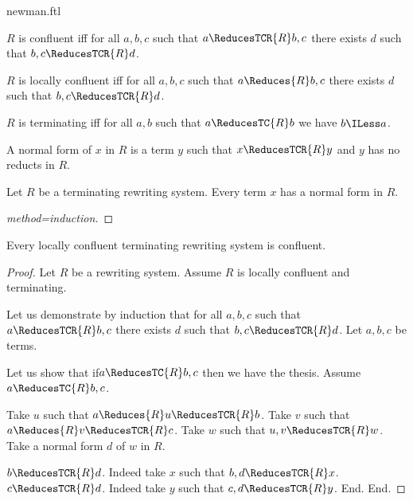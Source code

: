 \documentclass{stex}
\begin{document}
\begin{smodule}{newman.ftl}
\begin{forthel}
  \begin{definition}[title=Confluency]
    $R$ is confluent iff for all $a,b,c$ such that $a \ReducesTCR{R} b,c$ there exists $d$ such that $b,c \ReducesTCR{R} d$.
  \end{definition}

  \begin{definition}[title=Local Confluency]
    $R$ is locally confluent iff for all $a, b, c$ such that $a \Reduces{R} b, c$   there exists $d$ such that $b, c \ReducesTCR{R} d$.
  \end{definition}

  \begin{definition}[title=Termination]
    $R$ is terminating iff for all $a, b$ such that $a \ReducesTC{R} b$ we have $b \ILess a$.
  \end{definition}

  \begin{definition}[title=Normal Form]
    A normal form of $x$ in $R$ is a term $y$ such that $x \ReducesTCR{R} y$ and $y$ has no reducts in $R$.
  \end{definition}

  \begin{lemma}
    Let $R$ be a terminating rewriting system.
    Every term $x$ has a normal form in $R$.
  \end{lemma}
  \begin{proof}[method=induction]
  \end{proof}

  \begin{theorem}[title=Newman's Lemma,name=Newman]
    Every locally confluent terminating rewriting system is confluent.
  \end{theorem}
  \begin{proof}
    Let $R$ be a rewriting system.
    Assume $R$ is locally confluent and terminating.

    Let us demonstrate by induction that for all $a,b,c$ such that $a \ReducesTCR{R} b,c$ there exists $d$ such that $b,c \ReducesTCR{R} d$.
      Let $a,b,c$ be terms.

      Let us show that if$ a \ReducesTC{R} b,c$ then we have the thesis.
        Assume $a \ReducesTC{R} b,c$.
  
        Take $u$ such that $a \Reduces{R} u \ReducesTCR{R} b$.
        Take $v$ such that $a \Reduces{R} v \ReducesTCR{R} c$.
        Take $w$ such that $u,v \ReducesTCR{R} w$.
        Take a normal form $d$ of $w$ in $R$.
  
        $b \ReducesTCR{R} d$.
        Indeed take $x$ such that $b,d \ReducesTCR{R} x$. 
        $c \ReducesTCR{R} d$.
        Indeed take $y$ such that $c,d \ReducesTCR{R} y$.
      End.
    End.
  \end{proof}
\end{forthel}


\end{smodule}
\end{document}
